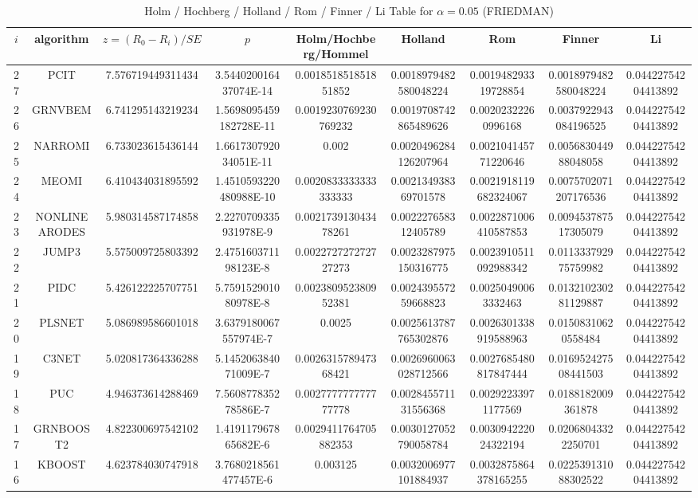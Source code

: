 \documentclass[a4paper,10pt]{article}
\begin{document}
\begin{landscape}
\begin{table}[!htp]
\centering\scriptsize
\caption{Holm / Hochberg / Holland / Rom / Finner / Li Table for $\alpha=0.05$ (FRIEDMAN)}
\begin{tabular}{ccccccccc}
$i$&algorithm&$z=(R_0 - R_i)/SE$&$p$&Holm/Hochberg/Hommel&Holland&Rom&Finner&Li\\
\hline
27&PCIT&7.576719449311434&3.544020016437074E-14&0.001851851851851852&0.0018979482580048224&0.001948293319728854&0.0018979482580048224&0.04422754204413892\\
26&GRNVBEM&6.741295143219234&1.5698095459182728E-11&0.0019230769230769232&0.0019708742865489626&0.00202322260996168&0.0037922943084196525&0.04422754204413892\\
25&NARROMI&6.733023615436144&1.661730792034051E-11&0.002&0.0020496284126207964&0.002104145771220646&0.005683044988048058&0.04422754204413892\\
24&MEOMI&6.410434031895592&1.4510593220480988E-10&0.0020833333333333333&0.002134938369701578&0.0021918119682324067&0.0075702071207176536&0.04422754204413892\\
23&NONLINEARODES&5.980314587174858&2.2270709335931978E-9&0.002173913043478261&0.002227658312405789&0.0022871006410587853&0.009453787517305079&0.04422754204413892\\
22&JUMP3&5.575009725803392&2.475160371198123E-8&0.002272727272727273&0.0023287975150316775&0.0023910511092988342&0.011333792975759982&0.04422754204413892\\
21&PIDC&5.426122225707751&5.759152901080978E-8&0.002380952380952381&0.002439557259668823&0.00250490063332463&0.013210230281129887&0.04422754204413892\\
20&PLSNET&5.086989586601018&3.6379180067557974E-7&0.0025&0.0025613787765302876&0.0026301338919588963&0.01508310620558484&0.04422754204413892\\
19&C3NET&5.020817364336288&5.145206384071009E-7&0.002631578947368421&0.0026960063028712566&0.0027685480817847444&0.016952427508441503&0.04422754204413892\\
18&PUC&4.946373614288469&7.560877835278586E-7&0.002777777777777778&0.002845571131556368&0.00292233971177569&0.0188182009361878&0.04422754204413892\\
17&GRNBOOST2&4.822300697542102&1.419117967865682E-6&0.0029411764705882353&0.0030127052790058784&0.003094222024322194&0.02068043322250701&0.04422754204413892\\
16&KBOOST&4.623784030747918&3.7680218561477457E-6&0.003125&0.0032006977101884937&0.0032875864378165255&0.022539131088302522&0.04422754204413892\\

\end{tabular}
\end{table}
\end{landscape}
\end{document}
